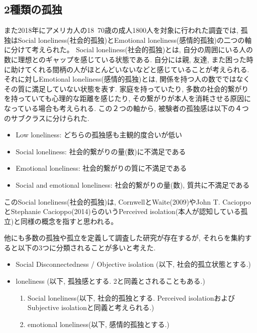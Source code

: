 \documentclass[a4paper,dvipdfmx]{hisken}
\begin{document}
\subsection{2種類の孤独}

また2018年にアメリカ人の18~70歳の成人1800人を対象に行われた調査では, 孤独はSocial loneliness(社会的孤独)とEmotional loneliness(感情的孤独)の二つの軸に分けて考えられた{}\cite{tex3}。
Social loneliness(社会的孤独)とは, 自分の周囲にいる人の数に理想とのギャップを感じている状態である. 自分には親, 友達, また困った時に助けてくれる間柄の人がほとんどいないなどと感じていることが考えられる. それに対しEmotional loneliness(感情的孤独)とは, 関係を持つ人の数でではなくその質に満足していない状態を表す. 家庭を持っていたり, 多数の社会的繋がりを持っていても心理的な距離を感じたり, その繋がりが本人を消耗させる原因になっている場合も考えられる. 
この２つの軸から, 被験者の孤独感は以下の４つのサブクラスに分けられた. 
\begin{itemize}
\item Low loneliness: どちらの孤独感も主観的度合いが低い
\item Social loneliness: 社会的繋がりの量(数)に不満足である
\item Emotional loneliness:  社会的繋がりの質に不満足である
\item Social and emotional loneliness: 社会的繋がりの量(数), 質共に不満足である
\end{itemize}
このSocial loneliness(社会的孤独)は, CornwellとWaite(2009)やJohn T. CacioppoとStephanie Cacioppo(2014)らのいうPerceived isolation(本人が認知している孤立)と同様の概念を指すと思われる。

他にも多数の孤独や孤立を定義して調査した研究が存在するが, それらを集約すると以下の3つに分類されることが多いと考えた.
\begin{itemize}
\item Social Disconnectedness / Objective isolation (以下, 社会的孤立状態とする.)
\item loneliness (以下, 孤独感とする. 2と同義とされることもある.)
\begin{enumerate}
\item Social loneliness(以下, 社会的孤独とする. Perceived isolationおよびSubjective isolationと同義と考えられる.)
\item emotional loneliness(以下, 感情的孤独とする.)
\end{enumerate}
\end{itemize}

\section{}
\end{document}
